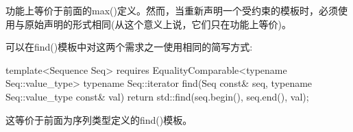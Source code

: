 功能上等价于前面的max()定义。然而，当重新声明一个受约束的模板时，必须使用与原始声明的形式相同(从这个意义上说，它们只在功能上等价)。

可以在find()模板中对这两个需求之一使用相同的简写方式:

\begin{cpp}
template<Sequence Seq>
	requires EqualityComparable<typename Seq::value_type>
typename Seq::iterator find(Seq const& seq,
							typename Seq::value_type const& val)
{
	return std::find(seq.begin(), seq.end(), val);
}
\end{cpp}

这等价于前面为序列类型定义的find()模板。





